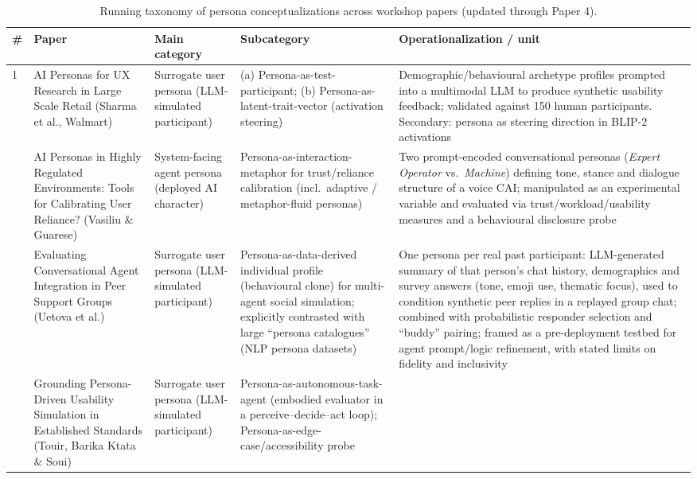 \begin{table}[t]
\centering
\caption{Running taxonomy of persona conceptualizations across workshop papers (updated through Paper 4).}
\label{tab:persona-taxonomy}
\small
\begin{tabular}{p{0.5cm} p{3.6cm} p{3.4cm} p{3.6cm} p{3.6cm}}
\toprule
\textbf{\#} & \textbf{Paper} & \textbf{Main category} & \textbf{Subcategory} & \textbf{Operationalization / unit} \\
\midrule
1 & AI Personas for UX Research in Large Scale Retail (Sharma et al., Walmart) &
Surrogate user persona (LLM-simulated participant) &
(a) Persona-as-test-participant; (b) Persona-as-latent-trait-vector (activation steering) &
Demographic/behavioural archetype profiles prompted into a multimodal LLM to produce synthetic usability feedback; validated against 150 human participants. Secondary: persona as steering direction in BLIP-2 activations \\
\addlinespace
2 & AI Personas in Highly Regulated Environments: Tools for Calibrating User Reliance? (Vasiliu \& Guarese) &
System-facing agent persona (deployed AI character) &
Persona-as-interaction-metaphor for trust/reliance calibration (incl.\ adaptive / metaphor-fluid personas) &
Two prompt-encoded conversational personas (\textit{Expert Operator} vs.\ \textit{Machine}) defining tone, stance and dialogue structure of a voice CAI; manipulated as an experimental variable and evaluated via trust/workload/usability measures and a behavioural disclosure probe \\
\addlinespace
3 & Evaluating Conversational Agent Integration in Peer Support Groups (Uetova et al.) &
Surrogate user persona (LLM-simulated participant) &
Persona-as-data-derived individual profile (behavioural clone) for multi-agent social simulation; explicitly contrasted with large ``persona catalogues'' (NLP persona datasets) &
One persona per real past participant: LLM-generated summary of that person's chat history, demographics and survey answers (tone, emoji use, thematic focus), used to condition synthetic peer replies in a replayed group chat; combined with probabilistic responder selection and ``buddy'' pairing; framed as a pre-deployment testbed for agent prompt/logic refinement, with stated limits on fidelity and inclusivity \\
\addlinespace
4 & Grounding Persona-Driven Usability Simulation in Established Standards (Touir, Barika Ktata \& Soui) &
Surrogate user persona (LLM-simulated participant) &
Persona-as-autonomous-task-agent (embodied evaluator in a perceive--decide--act loop); Persona-as-edge-case/accessibility probe &

\end{tabular}
\end{table}
